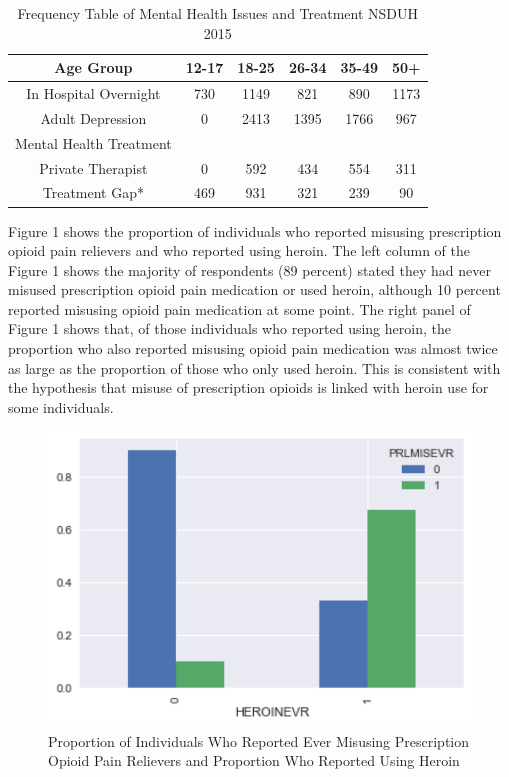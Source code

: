 \documentclass[sigconf]{acmart}
\begin{document}
\begin{table}
  \caption{Frequency Table of Mental Health Issues and Treatment NSDUH 2015
  \cite{samhsa16}}
  \label{tab:freq}
  \begin{tabular}{cccccc}
    \toprule
    Age Group & 12-17& 18-25& 26-34& 35-49& 50+\\
    \midrule
    In Hospital Overnight& 730& 1149& 821& 890& 1173 \\
    Adult Depression& 0& 2413& 1395& 1766& 967 \\
    \midrule
    Mental Health Treatment& & & & & \\
    \midrule
    Private Therapist& 0& 592& 434& 554& 311 \\
    Treatment Gap*& 469& 931& 321& 239& 90 \\
    \bottomrule
  \end{tabular}
\end{table}


Figure 1 shows the proportion of individuals who reported misusing prescription 
opioid pain relievers and who reported using heroin. The left column of the 
Figure 1 shows the majority of respondents (89 percent) stated they had never 
misused prescription opioid pain medication or used heroin, although 10 percent 
reported misusing opioid pain medication at some point. The right panel of 
Figure 1 shows that, of those individuals who reported using heroin, the 
proportion who also reported misusing opioid pain medication was almost twice 
as large as the proportion of those who only used heroin. This is consistent 
with the hypothesis that misuse of prescription opioids is linked with heroin 
use for some individuals.

\begin{figure}[!ht]
  \centering\includegraphics[width=\columnwidth]{images/Figure1.pdf}
  \caption{Proportion of Individuals Who Reported Ever Misusing Prescription
  Opioid Pain Relievers and Proportion Who Reported Using Heroin}
  \label{f:Figure1}
\end{figure}
\end{document}

